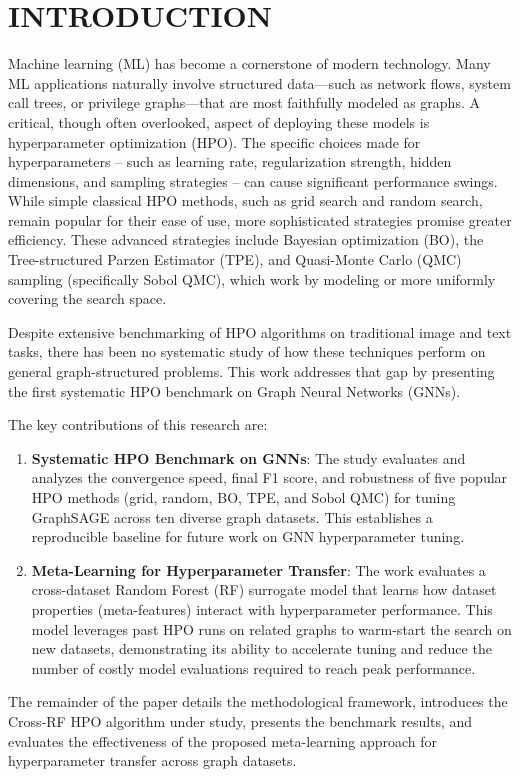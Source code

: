 \section{\uppercase{Introduction}}

Machine learning (ML) has become a cornerstone of modern technology. Many ML applications naturally involve structured data—such as network flows, system call trees, or privilege graphs—that are most faithfully modeled as graphs. A critical, though often overlooked, aspect of deploying these models is hyperparameter optimization (HPO). The specific choices made for hyperparameters -- such as learning rate, regularization strength, hidden dimensions, and sampling strategies -- can cause significant performance swings. While simple classical HPO methods, such as grid search and random search, remain popular for their ease of use, more sophisticated strategies promise greater efficiency. These advanced strategies include Bayesian optimization (BO), the Tree-structured Parzen Estimator (TPE), and Quasi-Monte Carlo (QMC) sampling (specifically Sobol QMC), which work by modeling or more uniformly covering the search space.

Despite extensive benchmarking of HPO algorithms on traditional image and text tasks, there has been no systematic study of how these techniques perform on general graph-structured problems. This work addresses that gap by presenting the first systematic HPO benchmark on Graph Neural Networks (GNNs).

The key contributions of this research are:
\begin{enumerate}
	\item \textbf{Systematic HPO Benchmark on GNNs}: The study evaluates and analyzes the convergence speed, final F1 score, and robustness of five popular HPO methods (grid, random, BO, TPE, and Sobol QMC) for tuning GraphSAGE across ten diverse graph datasets. This establishes a reproducible baseline for future work on GNN hyperparameter tuning.
	\item \textbf{Meta-Learning for Hyperparameter Transfer}: The work evaluates a cross-dataset Random Forest (RF) surrogate model that learns how dataset properties (meta-features) interact with hyperparameter performance. This model leverages past HPO runs on related graphs to warm-start the search on new datasets, demonstrating its ability to accelerate tuning and reduce the number of costly model evaluations required to reach peak performance.
\end{enumerate}

The remainder of the paper details the methodological framework, introduces the Cross-RF HPO algorithm under study, presents the benchmark results, and evaluates the effectiveness of the proposed meta-learning approach for hyperparameter transfer across graph datasets.
